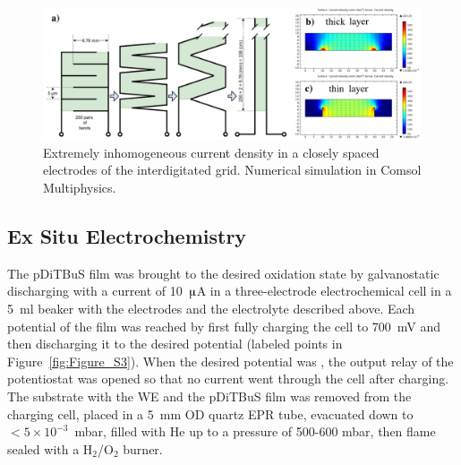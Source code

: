 \begin{figure}[h]
\center
	\includegraphics[width=1\textwidth]{./operando_epr/figures/solid/current_density.pdf}
	\caption{Extremely inhomogeneous current density in a closely spaced electrodes of the interdigitated grid. Numerical simulation in Comsol Multiphysics.}
	\label{fig:grid_current_density_sumulation}
\end{figure}



\subsection{Ex Situ Electrochemistry}
\label{sample_fab_2}
The pDiTBuS film was brought to the desired oxidation state by galvanostatic discharging with a current of 10~$\muup$A in a three-electrode electrochemical cell in a 5~ml beaker with the electrodes and the electrolyte described above.
Each potential of the film was reached by first fully charging the cell to 700~mV and then discharging it to the desired potential (labeled points in Figure~\ref{fig:Figure_S3}). When the desired potential was , the output relay of the potentiostat was opened so that no current went through the cell after charging. The substrate with the WE and the pDiTBuS film was removed from the charging cell, placed in a 5~mm OD quartz EPR tube, evacuated down to $<5\times10^{-3}$~mbar, filled with He up to a pressure of 500-600 mbar, then flame sealed with a H$_2$/O$_2$ burner.


